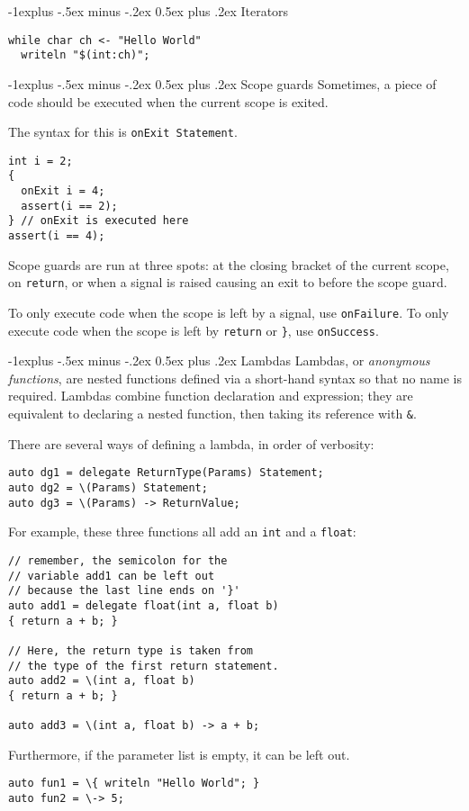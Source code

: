 \documentclass[a4paper,10pt,landscape]{article}
\makeatletter
\newenvironment{segment}[1]
{\begin{mdframed}[roundcorner=5pt]\subsection{#1}}
{\end{mdframed}\vspace{2pt plus 5pt}}
\renewcommand{\subsection}{\@startsection{subsection}{2}{0mm}%
			      {-1explus -.5ex minus -.2ex}%
			      {0.5ex plus .2ex}%
			      {\normalfont\normalsize\bfseries}}
\makeatother
\begin{document}
\begin{multicols}{3}
\begin{segment}{Iterators}
\begin{lstlisting}
while char ch <- "Hello World"
  writeln "$(int:ch)";
\end{lstlisting}
\end{segment}

\begin{segment}{Scope guards}
Sometimes, a piece of code should be executed when the current scope is exited.

The syntax for this is \texttt{onExit Statement}.

\begin{lstlisting}
int i = 2;
{
  onExit i = 4;
  assert(i == 2);
} // onExit is executed here
assert(i == 4);
\end{lstlisting}

Scope guards are run at three spots: at the closing bracket of the current scope, on \texttt{return},
or when a signal is raised causing an exit to before the scope guard.

To only execute code when the scope is left by a signal, use \texttt{onFailure}. To only execute code
when the scope is left by \texttt{return} or \texttt{\}}, use \texttt{onSuccess}.

\end{segment}

\begin{segment}{Lambdas}
Lambdas, or \emph{anonymous functions}, are nested functions defined via a short-hand syntax
so that no name is required. Lambdas combine function declaration and expression; they are
equivalent to declaring a nested function, then taking its reference with \texttt{\&}.

There are several ways of defining a lambda, in order of verbosity:

\begin{lstlisting}
auto dg1 = delegate ReturnType(Params) Statement;
auto dg2 = \(Params) Statement;
auto dg3 = \(Params) -> ReturnValue;
\end{lstlisting}

For example, these three functions all add an \texttt{int} and a \texttt{float}:

\begin{lstlisting}
// remember, the semicolon for the
// variable add1 can be left out
// because the last line ends on '}'
auto add1 = delegate float(int a, float b)
{ return a + b; }

// Here, the return type is taken from
// the type of the first return statement.
auto add2 = \(int a, float b)
{ return a + b; }

auto add3 = \(int a, float b) -> a + b;
\end{lstlisting}

Furthermore, if the parameter list is empty, it can be left out.

\begin{lstlisting}
auto fun1 = \{ writeln "Hello World"; }
auto fun2 = \-> 5;
\end{lstlisting}

\end{segment}

\end{multicols}
\end{document}
